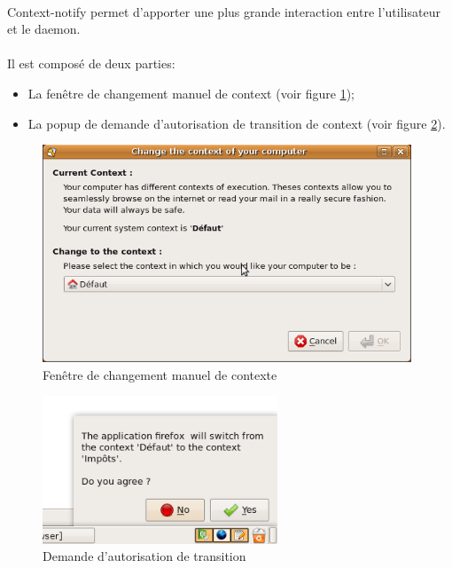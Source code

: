 		\paragraph*{}
			Context-notify permet d'apporter une plus grande interaction entre l'utilisateur et le daemon.
			
		\paragraph*{}
			Il est composé de deux parties:
			\begin{itemize}
   				\item La fenêtre de changement manuel de context (voir figure \ref{context-notify change context});
   				\item La popup de demande d'autorisation de transition de context (voir figure \ref{context-notify autorisation}).
   			\end{itemize}
			
		\begin{figure}[!h]
			\includegraphics[width=11cm]{images/contextnotifydlg.png}
			\caption{Fenêtre de changement manuel de contexte}
			\label{context-notify change context}
		\end{figure}
		
		\begin{figure}[!h]
			\includegraphics[width=7cm]{images/contextnotifypopup.png}
			\caption{Demande d'autorisation de transition}
			\label{context-notify autorisation}
		\end{figure}

